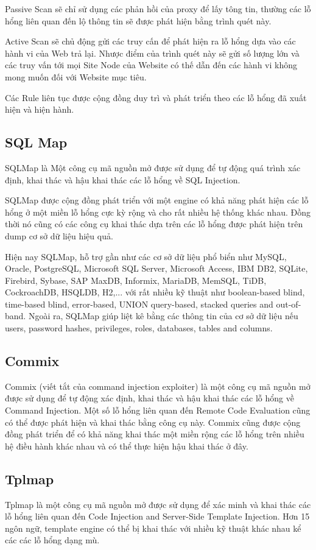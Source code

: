 \documentclass[./../main.tex]{subfiles}
\begin{document}
Passive Scan sẽ chỉ sử dụng các phản hồi của proxy để lấy tông tin, thường các lỗ hổng liên quan đến lộ thông tin sẽ được phát hiện bằng trình quét này.

Active Scan sẽ chủ động gửi các truy cấn để phát hiện ra lỗ hổng dựa vào các hành vi của Web trả lại. Nhược điểm của trình quét này sẽ gửi số lượng lớn và
các truy vấn tới mọi Site Node của Website có thế dẫn đến các hành vi không mong muốn đối với Website mục tiêu.

Các Rule liên tục được cộng đồng duy trì và phát triển theo các lỗ hổng đã xuất hiện và hiện hành.
\subsection{SQL Map}
SQLMap là Một công cụ mã nguồn mở được sử dụng để tự động quá trình xác định, khai thác và hậu khai thác các lỗ hổng về SQL Injection.

SQLMap được cộng đồng phát triển với một engine có khả năng phát hiện các lỗ hổng ở một miền lỗ hổng cực kỳ rộng và cho rất nhiều hệ thống khác nhau. Đồng thời nó cũng có các công cụ khai thác dựa trên các lỗ hổng được phát hiện trên dump cơ sở dữ liệu hiệu quả.

Hiện nay SQLMap, hỗ trợ gần như các cơ sở dữ liệu phổ biển như MySQL, Oracle, PostgreSQL, Microsoft SQL Server, Microsoft Access, IBM DB2, SQLite, Firebird, Sybase, SAP MaxDB, Informix, MariaDB, MemSQL, TiDB, CockroachDB, HSQLDB, H2,... với rất nhiều kỹ thuật như boolean-based blind, time-based blind, error-based, UNION query-based, stacked queries and out-of-band. Ngoài ra, SQLMap giúp liệt kê bằng các thông tin của cơ sở dữ liệu nếu users, password hashes, privileges, roles, databases, tables and columns.
\subsection{Commix}
Commix (viết tắt của command injection exploiter) là một công cụ mã nguồn mở được sử dụng để tự động xác định, khai thác và hậu khai thác các lỗ hổng về Command Injection. Một số lỗ hổng liên quan đến Remote Code Evaluation cũng có thể được phát hiện và khai thác bằng công cụ này.
Commix cũng được cộng đồng phát triển để có khả năng khai thác một miền rộng các lỗ hổng trên nhiều hệ điều hành khác nhau và có thể thực hiện hậu khai thác ở đây.
\subsection{Tplmap}
Tplmap là một công cụ mã nguồn mở được sử dụng để xác minh và khai thác các lỗ hổng liên quan đến Code Injection and Server-Side Template Injection.
Hơn 15 ngôn ngữ, template engine có thể bị khai thác với nhiều kỹ thuật khác nhau kể các các lỗ hổng dạng mù.
\end{document}
